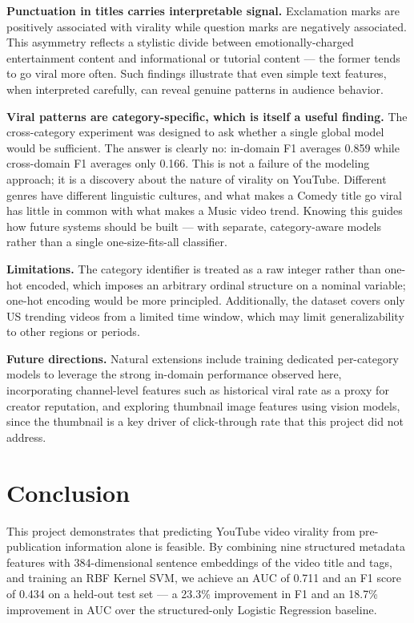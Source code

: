 \documentclass[12pt,a4paper]{article}
\begin{document}
\textbf{Punctuation in titles carries interpretable signal.}  Exclamation
marks are positively associated with virality while question marks are
negatively associated.  This asymmetry reflects a stylistic divide between
emotionally-charged entertainment content and informational or tutorial content
--- the former tends to go viral more often.  Such findings illustrate that
even simple text features, when interpreted carefully, can reveal genuine
patterns in audience behavior.

\textbf{Viral patterns are category-specific, which is itself a useful
finding.}  The cross-category experiment was designed to ask whether a single
global model would be sufficient.  The answer is clearly no: in-domain F1
averages 0.859 while cross-domain F1 averages only 0.166.  This is not a
failure of the modeling approach; it is a discovery about the nature of
virality on YouTube.  Different genres have different linguistic cultures, and
what makes a Comedy title go viral has little in common with what makes a Music
video trend.  Knowing this guides how future systems should be built ---
with separate, category-aware models rather than a single one-size-fits-all
classifier.

\textbf{Limitations.}  The category identifier is treated as a raw integer
rather than one-hot encoded, which imposes an arbitrary ordinal structure on a
nominal variable; one-hot encoding would be more principled.  Additionally,
the dataset covers only US trending videos from a limited time window, which
may limit generalizability to other regions or periods.

\textbf{Future directions.}  Natural extensions include training dedicated
per-category models to leverage the strong in-domain performance observed here,
incorporating channel-level features such as historical viral rate as a proxy
for creator reputation, and exploring thumbnail image features using vision
models, since the thumbnail is a key driver of click-through rate that this
project did not address.

\section{Conclusion}

This project demonstrates that predicting YouTube video virality from
pre-publication information alone is feasible.  By combining nine structured
metadata features with 384-dimensional sentence embeddings of the video title
and tags, and training an RBF Kernel SVM, we achieve an AUC of 0.711 and an F1
score of 0.434 on a held-out test set --- a 23.3\% improvement in F1 and an
18.7\% improvement in AUC over the structured-only Logistic Regression baseline.
\end{document}
